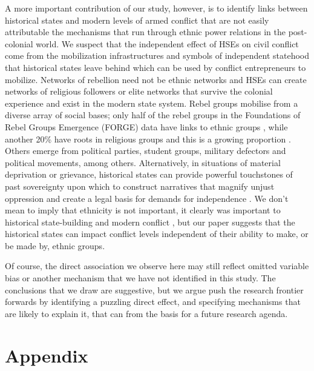 A more important contribution of our study, however, is to identify links
between historical states and modern levels of armed conflict that are not
easily attributable the mechanisms that run through ethnic power relations in
the post-colonial world. We suspect that the independent effect of HSEs on civil
conflict come from the mobilization infrastructures and symbols of independent
statehood that historical states leave behind which can be used by conflict
entrepreneurs to mobilize.  Networks of rebellion need not be ethnic networks
\citep{Staniland2014} and HSEs can create networks of religious followers or
elite networks that survive the colonial experience and exist in the modern
state system. Rebel groups mobilise from a diverse array of social bases; only
half of the rebel groups in the Foundations of Rebel Groups Emergence (FORGE)
data have links to ethnic groups \citep{Braithwaite2020}, while another 20\%
have roots in religious groups and this is a growing proportion
\citep{Svensson2019}. Others emerge from political parties, student groups,
military defectors and political movements, among others. Alternatively, in
situations of material deprivation or grievance, historical states can provide
powerful touchstones of past sovereignty upon which to construct narratives that
magnify unjust oppression and create a legal basis for demands for independence
\citep{Ahram2019, Shelef2016}. We don't mean to imply that ethnicity is not
important, it clearly was important to historical state-building
\citep{Herbst2014} and modern conflict \citep{Cederman2013}, but our paper
suggests that the historical states can impact conflict levels independent of
their ability to make, or be made by, ethnic groups. 

Of course, the direct association we observe here may still reflect omitted
variable bias or another mechanism that we have not identified in this study.
The conclusions that we draw are suggestive, but we argue push the research
frontier forwards by identifying a puzzling direct effect, and specifying
mechanisms that are likely to explain it, that can from the basis for a future
research agenda. 
    
\clearpage 

 


\clearpage 

\section{Appendix}

